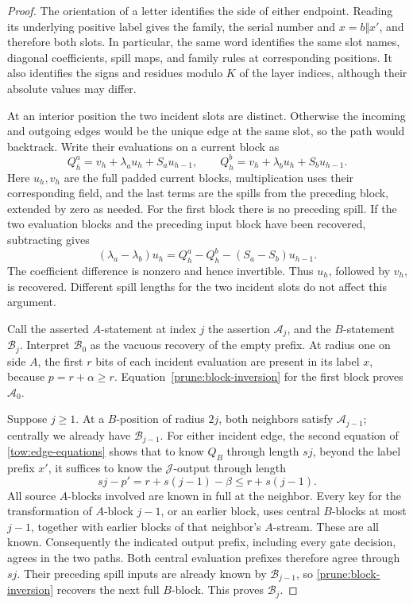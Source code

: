 \begin{proof}
The orientation of a letter identifies the side of either endpoint.
Reading its underlying positive label gives the family, the serial
number and \(x=b\Vert x'\), and therefore both slots.  In particular,
the same word identifies the same slot names, diagonal coefficients,
spill maps, and family rules at corresponding positions.  It also
identifies the signs and residues modulo \(K\) of the layer indices,
although their absolute values may differ.

At an interior position the two incident slots are distinct.  Otherwise
the incoming and outgoing edges would be the unique edge at the same
slot, so the path would backtrack.  Write their evaluations on a current
block as
\[
 Q^a_h=v_h+\lambda_a u_h+S_a u_{h-1},\qquad
 Q^b_h=v_h+\lambda_b u_h+S_b u_{h-1}.
\]
Here \(u_h,v_h\) are the full padded current blocks, multiplication
uses their corresponding field, and the last terms are the spills
from the preceding block, extended by zero as needed.  For the first
block there is no preceding spill.  If the two evaluation blocks and
the preceding input block have been recovered, subtracting gives
\begin{equation}
 (\lambda_a-\lambda_b)u_h
   =Q^a_h-Q^b_h-(S_a-S_b)u_{h-1}.
 \label{prune:block-inversion}
\end{equation}
The coefficient difference is nonzero and hence invertible.  Thus
\(u_h\), followed by \(v_h\), is recovered.  Different spill
lengths for the two incident slots do not affect this argument.

Call the asserted \(A\)-statement at index \(j\) the assertion
\(\mathcal A_j\), and the \(B\)-statement \(\mathcal B_j\).
Interpret \(\mathcal B_0\) as the vacuous recovery of the empty
prefix.  At radius one on side \(A\), the first \(r\) bits of each
incident evaluation are present in its label \(x\), because
\(p=r+\alpha\geq r\).  Equation~\eqref{prune:block-inversion}
for the first block proves \(\mathcal A_0\).

Suppose \(j\geq1\).  At a \(B\)-position of radius \(2j\), both
neighbors satisfy \(\mathcal A_{j-1}\); centrally we already have
\(\mathcal B_{j-1}\).  For either incident edge, the second equation
of \eqref{tow:edge-equations} shows that to know \(Q_B\) through
length \(sj\), beyond the label prefix \(x'\), it suffices to know
the \(\mathcal J\)-output through length
\[
 sj-p'=r+s(j-1)-\beta\leq r+s(j-1).
\]
All source \(A\)-blocks involved are known in full at the neighbor.
Every key for the transformation of \(A\)-block \(j-1\), or an
earlier block, uses central \(B\)-blocks at most \(j-1\), together
with earlier blocks of that neighbor's \(A\)-stream.  These are all
known.  Consequently the indicated output prefix, including every
gate decision, agrees in the two paths.  Both central evaluation
prefixes therefore agree through \(sj\).  Their preceding spill
inputs are already known by \(\mathcal B_{j-1}\), so
\eqref{prune:block-inversion} recovers the next full \(B\)-block.
This proves \(\mathcal B_j\).


\end{proof}
